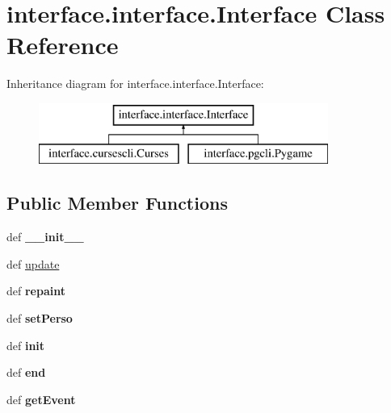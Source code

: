 \hypertarget{classinterface_1_1interface_1_1_interface}{\section{interface.\-interface.\-Interface \-Class \-Reference}
\label{classinterface_1_1interface_1_1_interface}
}
\-Inheritance diagram for interface.\-interface.\-Interface\-:\begin{figure}[H]
\begin{center}
\leavevmode
\includegraphics[height=2.000000cm]{classinterface_1_1interface_1_1_interface}
\end{center}
\end{figure}
\subsection*{\-Public \-Member \-Functions}
\begin{DoxyCompactItemize}
\item 
\hypertarget{classinterface_1_1interface_1_1_interface_ac897e94279885c6ac7368b26280b1ca3}{def {\bfseries \-\_\-\-\_\-init\-\_\-\-\_\-}}\label{classinterface_1_1interface_1_1_interface_ac897e94279885c6ac7368b26280b1ca3}

\item 
def \hyperlink{classinterface_1_1interface_1_1_interface_ae88eadf76465fc08de5b43ceb851b33c}{update}
\item 
\hypertarget{classinterface_1_1interface_1_1_interface_af98554929f55ff181f077938c49be445}{def {\bfseries repaint}}\label{classinterface_1_1interface_1_1_interface_af98554929f55ff181f077938c49be445}

\item 
\hypertarget{classinterface_1_1interface_1_1_interface_a5d5d771f07df8593a3c9a16b3c93cf87}{def {\bfseries set\-Perso}}\label{classinterface_1_1interface_1_1_interface_a5d5d771f07df8593a3c9a16b3c93cf87}

\item 
\hypertarget{classinterface_1_1interface_1_1_interface_a65d6c992d5c9ffe07bec1b57b05f171c}{def {\bfseries init}}\label{classinterface_1_1interface_1_1_interface_a65d6c992d5c9ffe07bec1b57b05f171c}

\item 
\hypertarget{classinterface_1_1interface_1_1_interface_aad5e69ce9ff8080f12d744ca1d7e31d9}{def {\bfseries end}}\label{classinterface_1_1interface_1_1_interface_aad5e69ce9ff8080f12d744ca1d7e31d9}

\item 
\hypertarget{classinterface_1_1interface_1_1_interface_af1f6baa08b21da6eb3458f91b9fc43a6}{def {\bfseries get\-Event}}\label{classinterface_1_1interface_1_1_interface_af1f6baa08b21da6eb3458f91b9fc43a6}

\end{DoxyCompactItemize}
